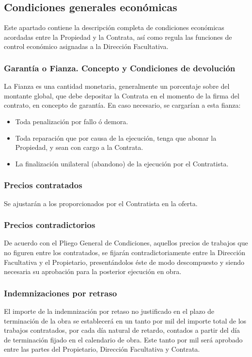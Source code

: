 \documentclass[../main.tex]{subfiles}
\begin{document}
\subsection{Condiciones generales económicas}
Este apartado contiene la descripción completa de condiciones económicas acordadas entre la Propiedad y la Contrata, así como regula las funciones de control económico asignadas  a la Dirección Facultativa.

\subsubsection{Garantía o Fianza. Concepto y Condiciones de devolución}
La Fianza es una cantidad monetaria, generalmente un porcentaje sobre del montante global, que debe depositar la Contrata en el momento de la firma del contrato, en concepto de garantía. En caso necesario, se cargarían a esta fianza:
\begin{itemize}
    \item Toda penalización por fallo ó demora.
    \item Toda reparación que por causa de la ejecución, tenga que abonar la Propiedad, y sean con cargo a la Contrata.
    \item La finalización unilateral (abandono) de la ejecución por el Contratista.
\end{itemize}

\subsubsection{Precios contratados}
Se ajustarán a los proporcionados por el Contratista en la oferta.

\subsubsection{Precios contradictorios}
De acuerdo con el Pliego General de Condiciones, aquellos precios de trabajos que no figuren entre los contratados, se fijarán contradictoriamente entre la Dirección Facultativa y el Propietario, presentándolos éste de modo descompuesto y siendo necesaria su aprobación para la posterior ejecución en obra.

\subsubsection{Indemnizaciones por retraso}
El importe de la indemnización por retaso no justificado en el plazo de terminación de la obra se establecerá en un tanto por mil del importe total de los trabajos contratados, por cada día natural de retardo, contados a partir del día de terminación fijado en el calendario de obra. Este tanto por mil será aprobado entre las partes del Propietario, Dirección Facultativa y Contrata.
\end{document}
